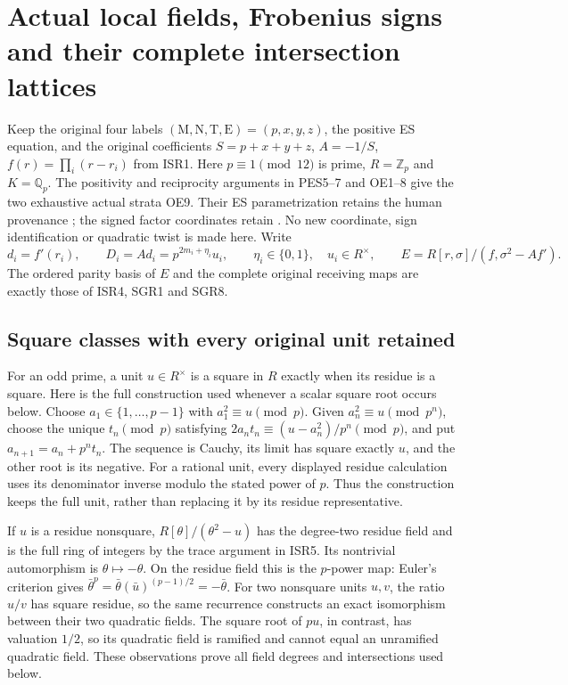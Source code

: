 \documentclass[11pt]{article}
\begin{document}
\section{Actual local fields, Frobenius signs and their complete intersection lattices}
Keep the original four labels $(\mathrm M,\mathrm N,\mathrm T,\mathrm E)
=(p,x,y,z)$, the positive ES equation, and the original coefficients
$S=p+x+y+z$, $A=-1/S$, $f(r)=\prod_i(r-r_i)$ from ISR1.
Here $p\equiv1\pmod {12}$ is prime, $R=\mathbb Z_p$ and
$K=\mathbb Q_p$. The positivity and reciprocity arguments in
PES5--7 and OE1--8 give the two exhaustive actual strata OE9.
Their ES parametrization retains the human provenance
\cite[Section 2, Type I and Type II parametrizations]{ElsholtzTao2015};
the signed factor coordinates retain \cite{ES488,Tao}.
No new coordinate, sign identification or quadratic twist is made here.
Write
\[
 d_i=f'(r_i),\qquad D_i=A d_i=p^{2m_i+\eta_i}u_i,
 \qquad \eta_i\in\{0,1\},\quad u_i\in R^\times,\qquad
 E=R[r,\sigma]/(f,\sigma^2-Af').                    \tag{SLF1}
\]
The ordered parity basis of $E$ and the complete original receiving
maps are exactly those of ISR4, SGR1 and SGR8.

\subsection{Square classes with every original unit retained}
For an odd prime, a unit $u\in R^\times$ is a square in $R$ exactly
when its residue is a square. Here is the full construction used
whenever a scalar square root occurs below. Choose
$a_1\in\{1,\ldots,p-1\}$ with $a_1^2\equiv u\pmod p$. Given
$a_n^2\equiv u\pmod {p^n}$, choose the unique $t_n\pmod p$ satisfying
$2a_nt_n\equiv(u-a_n^2)/p^n\pmod p$, and put
$a_{n+1}=a_n+p^nt_n$. The sequence is Cauchy, its limit has square
exactly $u$, and the other root is its negative. For a rational unit,
every displayed residue calculation uses its denominator inverse
modulo the stated power of $p$. Thus the construction keeps the full
unit, rather than replacing it by its residue representative.

If $u$ is a residue nonsquare, $R[\theta]/(\theta^2-u)$ has the
degree-two residue field and is the full ring of integers by the
trace argument in ISR5. Its nontrivial automorphism is
$\theta\mapsto-\theta$. On the residue field this is the
$p$-power map: Euler's criterion gives
$\bar\theta^p=\bar\theta(\bar u)^{(p-1)/2}=-\bar\theta$.
For two nonsquare units $u,v$, the ratio $u/v$ has square residue,
so the same recurrence constructs an exact isomorphism between
their two quadratic fields. The square root of $pu$, in contrast,
has valuation $1/2$, so its quadratic field is ramified and cannot
equal an unramified quadratic field. These observations prove all
field degrees and intersections used below.
\end{document}
